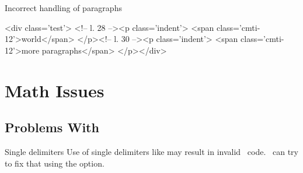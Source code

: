 \begin{issue}{Incorrect handling of paragraphs}
\begin{htmlsource}
<div class='test'>
<!-- l. 28 --><p class='indent'>   <span class='cmti-12'>world</span>
</p><!-- l. 30 --><p class='indent'>   <span class='cmti-12'>more paragraphs</span>
</p></div>
\end{htmlsource}


\end{issue}



\section{Math Issues}
\subsection{Problems With \term{\mathml}}

\begin{issue}{Single delimiters}
  Use of single delimiters like \texcommand{$\langle$} may result in invalid
  \mathml\ code. \texfourht\ can try to fix that using the 
  option.
\end{issue}



